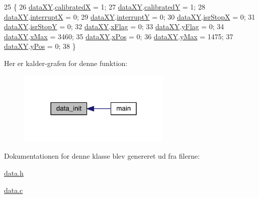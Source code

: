 \begin{DoxyCode}
25 \{
26   \hyperlink{data_8h_a89d7998a721b3f36f9f4131e7a5e42d2}{dataXY}.\hyperlink{data_8h_a20403c23f502143a2dd7ee5bb641c0ab}{calibratedX} = 1;
27   \hyperlink{data_8h_a89d7998a721b3f36f9f4131e7a5e42d2}{dataXY}.\hyperlink{data_8h_adebeaa27d72b604babe006a478cfed16}{calibratedY} = 1;
28   \hyperlink{data_8h_a89d7998a721b3f36f9f4131e7a5e42d2}{dataXY}.\hyperlink{data_8h_a4cacb2964bb4b589bf79aa64a398725b}{interruptX} = 0;
29   \hyperlink{data_8h_a89d7998a721b3f36f9f4131e7a5e42d2}{dataXY}.\hyperlink{data_8h_a0149ea97a32442280eb1c0b30c1eeaf1}{interruptY} = 0;
30   \hyperlink{data_8h_a89d7998a721b3f36f9f4131e7a5e42d2}{dataXY}.\hyperlink{data_8h_ab8211b7be27d53644048a83fccb95d70}{isrStopX} = 0;
31   \hyperlink{data_8h_a89d7998a721b3f36f9f4131e7a5e42d2}{dataXY}.\hyperlink{data_8h_a92ec85e6a09f5dc7ed83640f1810c4bb}{isrStopY} = 0;
32   \hyperlink{data_8h_a89d7998a721b3f36f9f4131e7a5e42d2}{dataXY}.\hyperlink{data_8h_abd60bb18cb69d4a782e0334caad9ffbc}{xFlag} = 0;
33   \hyperlink{data_8h_a89d7998a721b3f36f9f4131e7a5e42d2}{dataXY}.\hyperlink{data_8h_a2093b99c34cd9ec2a282b9c4c3f61935}{yFlag} = 0;
34   \hyperlink{data_8h_a89d7998a721b3f36f9f4131e7a5e42d2}{dataXY}.\hyperlink{data_8h_a5b6ae90a32a5f290afcc50656befceca}{xMax} = 3460;
35   \hyperlink{data_8h_a89d7998a721b3f36f9f4131e7a5e42d2}{dataXY}.\hyperlink{data_8h_a5262e09f478a571552e65be75c506bdb}{xPos} = 0;
36   \hyperlink{data_8h_a89d7998a721b3f36f9f4131e7a5e42d2}{dataXY}.\hyperlink{data_8h_ab979b62fb4882313ad47718325e34879}{yMax} = 1475;
37   \hyperlink{data_8h_a89d7998a721b3f36f9f4131e7a5e42d2}{dataXY}.\hyperlink{data_8h_a4c7347df04ab0f3d860046571be08af4}{yPos} = 0;
38 \}
\end{DoxyCode}


Her er kalder-\/grafen for denne funktion\+:\nopagebreak
\begin{figure}[H]
\begin{center}
\leavevmode
\includegraphics[width=207pt]{dc/d07/class_data_adf37c815716edf228a3cbb4564290275_icgraph}
\end{center}
\end{figure}




Dokumentationen for denne klasse blev genereret ud fra filerne\+:\begin{DoxyCompactItemize}
\item 
\hyperlink{data_8h}{data.\+h}\item 
\hyperlink{data_8c}{data.\+c}\end{DoxyCompactItemize}
